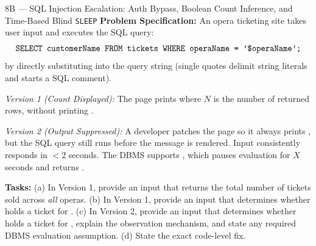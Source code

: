 \begin{templatebox}{8B --- SQL Injection Escalation: Auth Bypass, Boolean Count Inference, and Time-Based Blind \texttt{SLEEP}}
\textbf{Problem Specification:} An opera ticketing site takes user input  and executes the SQL query:
\[
  \texttt{SELECT customerName FROM tickets WHERE operaName = '\$operaName';}
\]
by directly substituting  into the query string (single quotes  delimit string literals and \code{-- } starts a SQL comment).
\begin{compactitem}
  \item \emph{Version 1 (Count Displayed):} The page prints  where $N$ is the number of returned rows, without printing .
  \item \emph{Version 2 (Output Suppressed):} A developer patches the page so it always prints , but the SQL query still runs before the message is rendered. Input  consistently responds in $< 2$ seconds. The DBMS supports , which pauses evaluation for $X$ seconds and returns .
\end{compactitem}
\textbf{Tasks:} (a) In Version 1, provide an input  that returns the total number of tickets sold across \emph{all} operas. (b) In Version 1, provide an input  that determines whether  holds a ticket for . (c) In Version 2, provide an input  that determines whether  holds a ticket for , explain the observation mechanism, and state any required DBMS evaluation assumption. (d) State the exact code-level fix.


\end{templatebox}
